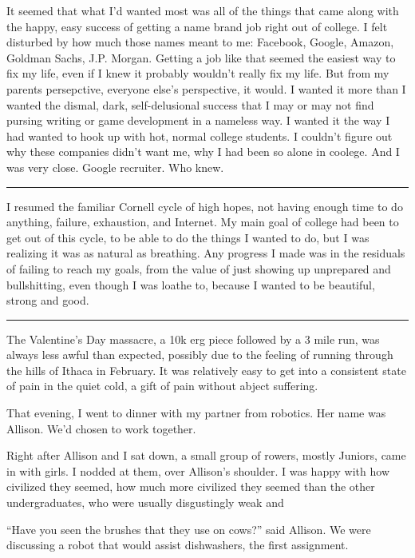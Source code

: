 It seemed that what I'd wanted most was all of the things that came along with
the happy, easy success of getting a name brand job right out of college.  I
felt disturbed by how much those names meant to me: Facebook, Google, Amazon,
Goldman Sachs, J.P. Morgan.  Getting a job like that seemed the easiest way to
fix my life, even if I knew it probably wouldn't really fix my life.  But from
my parents persepctive, everyone else's perspective, it would.  I wanted it more
than I wanted the dismal, dark, self-delusional success that I may or may not
find pursing writing or game development in a nameless way.  I wanted it the way
I had wanted to hook up with hot, normal college students.  I couldn't figure
out why these companies didn't want me, why I had been so alone in coolege.  And
I was very close.  Google recruiter.  Who knew.

\plainfancybreak{12pt}{2}{* * *}

I resumed the familiar Cornell cycle of high hopes, not having enough time to do
anything, failure, exhaustion, and Internet.  My main goal of college had been
to get out of this cycle, to be able to do the things I wanted to do, but I was
realizing it was as natural as breathing.  Any progress I made was in the
residuals of failing to reach my goals, from the value of just showing up
unprepared and bullshitting, even though I was loathe to, because I wanted to be
beautiful, strong and good.

\plainfancybreak{12pt}{2}{* * *}

The Valentine's Day massacre, a 10k erg piece followed by a 3 mile run, was
always less awful than expected, possibly due to the feeling of running through
the hills of Ithaca in February.  It was relatively easy to get into a
consistent state of pain in the quiet cold, a gift of pain without abject
suffering. 

That evening, I went to dinner with my partner from robotics.  Her name was
Allison.  We'd chosen to work together.  

Right after Allison and I sat down, a small group of rowers, mostly Juniors,
came in with girls.  I nodded at them, over Allison's shoulder.  I was happy
with how civilized they seemed, how much more civilized they seemed than the
other undergraduates, who were usually disgustingly weak and

``Have you seen the brushes that they use on cows?'' said Allison.  We were
discussing a robot that would assist dishwashers, the first assignment.

